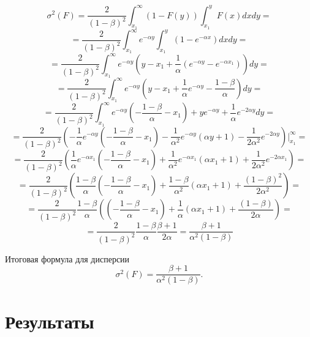 \documentclass[12pt, specialist, subf, substylefile = spbu.rtx]{disser}
\begin{document}
$$
\sigma^2(F)=\frac{2}{(1-\beta)^2}
\int_{x_1}^\infty
(1-F(y))\int_{x_1}^y F(x)dx dy =
$$
$$
=\frac{2}{(1-\beta)^2}
\int_{x_1}^\infty
e^{-\alpha y}\int_{x_1}^y (1-e^{-\alpha x})dx dy =
$$
$$
=\frac{2}{(1-\beta)^2} \int_{x_1}^\infty e^{-\alpha y}
(y-x_1+\frac{1}{\alpha}(e^{-\alpha y}-
e^{-\alpha x_1})) dy =
$$
$$
=\frac{2}{(1-\beta)^2} \int_{x_1}^\infty e^{-\alpha y}
(y-x_1+\frac{1}{\alpha}e^{-\alpha y}-
\frac{1-\beta}{\alpha}) dy =
$$
$$
=\frac{2}{(1-\beta)^2} \int_{x_1}^\infty 
e^{-\alpha y}(-\frac{1-\beta}{\alpha}-x_1)
+ ye^{-\alpha y}
+\frac{1}{\alpha}e^{-2\alpha y}dy =
$$
$$
=\frac{2}{(1-\beta)^2} \left(
-\frac{1}{\alpha}e^{-\alpha y}(-\frac{1-\beta}{\alpha}-x_1)
-\frac{1}{\alpha^2}e^{-\alpha y}(\alpha y + 1)
-\frac{1}{2\alpha^2}e^{-2\alpha y}
\right)|_{x_1}^\infty =
$$
$$
=\frac{2}{(1-\beta)^2} \left(
\frac{1}{\alpha}e^{-\alpha x_1}(-\frac{1-\beta}{\alpha}-x_1)
+\frac{1}{\alpha^2}e^{-\alpha x_1}(\alpha x_1 + 1)
+\frac{1}{2\alpha^2}e^{-2\alpha x_1}
\right) =
$$
$$
=\frac{2}{(1-\beta)^2} \left(
\frac{1-\beta}{\alpha}(-\frac{1-\beta}{\alpha}-x_1)
+\frac{1-\beta}{\alpha^2}(\alpha x_1 + 1)
+\frac{(1-\beta)^2}{2\alpha^2} \right) =
$$
$$
=\frac{2}{(1-\beta)^2} \frac{1-\beta}{\alpha} \left(
(-\frac{1-\beta}{\alpha}-x_1)
+\frac{1}{\alpha}(\alpha x_1 + 1)
+\frac{(1-\beta)}{2\alpha} \right) =
$$
$$
=\frac{2}{(1-\beta)^2} \frac{1-\beta}{\alpha} \frac{\beta + 1}{2\alpha} =\frac{\beta + 1}{\alpha^2(1-\beta)}
$$

Итоговая формула для дисперсии
\begin{equation}\label{eq:sigma_res}
\sigma^2(F)= \frac{\beta + 1}{\alpha^2(1-\beta)}.
\end{equation}

\chapter{Результаты}
\end{document}
